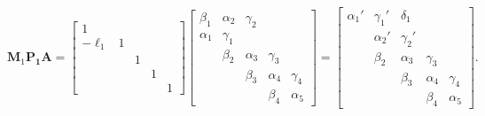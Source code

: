 \[
\boldsymbol{M}_1\boldsymbol{P_1}\boldsymbol{A}
=\begin{bmatrix}
      1& & & &\\
-\ell_1&1& & &\\
       & &1& &\\
       & & &1&\\
       & & & &1
\end{bmatrix}
\begin{bmatrix}
 \beta_1&\alpha_2&\gamma_2&        &\\
\alpha_1&\gamma_1&        &        &\\
        & \beta_2&\alpha_3&\gamma_3&\\
        &        & \beta_3&\alpha_4&\gamma_4\\
        &        &        & \beta_4&\alpha_5
\end{bmatrix}
=\begin{bmatrix}
\alpha_1'&\gamma_1'& \delta_1&        &\\
         &\alpha_2'&\gamma_2'&        &\\
         & \beta_2 &\alpha_3 &\gamma_3&\\
         &         & \beta_3 &\alpha_4&\gamma_4\\
         &         &         & \beta_4&\alpha_5
\end{bmatrix}.
\]

